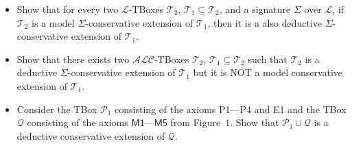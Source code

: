 \documentclass[12pt,a4paper]{article}
\newenvironment{problems}[2][{\color{purple}Question}]{\begin{trivlist}
\item[\hskip \labelsep {\bfseries #1}\hskip \labelsep {\bfseries #2.}]}{\end{trivlist}}
\begin{document}
\begin{problems}{{\color{purple}6 (with 1 bonus mark)}}
\begin{itemize}
\item[-] Show that for every two $\mathcal{L}$-TBoxes $\mathcal{T}_2$, $\mathcal{T}_{1}\subseteq\mathcal{T}_{2}$, and a signature $\Sigma$ over $\mathcal{L}$, if $\mathcal{T}_{2}$ is a model $\Sigma$-conservative extension of $\mathcal{T}_{1}$, then it is a also deductive $\Sigma$-conservative extension of $\mathcal{T}_{1}$.
\item[-] Show that there exists two $\mathcal{ALC}$-TBoxes $\mathcal{T}_2$, $\mathcal{T}_{1}\subseteq\mathcal{T}_{2}$ such that $\mathcal{T}_{2}$ is a deductive $\Sigma$-conservative extension of $\mathcal{T}_{1}$ but it is NOT a model conservative extension of $\mathcal{T}_{1}$.
\item[-] Consider the TBox $\mathcal{P}_{1}$ consisting of the axioms \textsf{P1---P4} and \textsf{E1} and the TBox $\mathcal{Q}$ consisting of the axioms $\textsf{M1---M5}$ from Figure~$1$. Show that $\mathcal{P}_{1}\cup\mathcal{Q}$ is a deductive conservative extension of $\mathcal{Q}$.
\end{itemize}

\end{problems}
\end{document}
